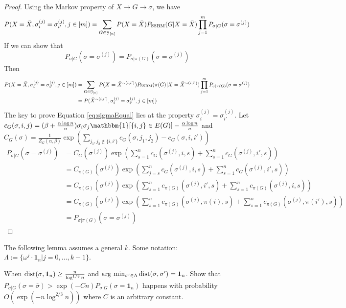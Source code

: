 \documentclass{article}
\begin{document}
\begin{proof}
Using the Markov property of $X \to G \to \sigma$, we have
\begin{align*}
P(X=\bar{X}, \sigma_i^{(j)} = \sigma_{i'}^{(j)}, j\in[m]) & = \sum_{G \in \mathcal{G}_{[n]}} P(X=\bar{X}) P_{\operatorname{SSBM}}(G  | X = \bar{X})\prod_{j=1}^m P_{\sigma | G}(\sigma =\sigma^{(j)})\\
\end{align*}
If we can show that 
\begin{equation}\label{eq:sigmaEqual}
P_{\sigma | G}(\sigma =\sigma^{(j)}) = P_{\sigma | \pi(G)}(\sigma =\sigma^{(j)})
\end{equation}
Then 
\begin{align*}
P(X=\bar{X}, \sigma_i^{(j)} = \sigma_{i'}^{(j)}, j\in[m]) & = \sum_{G \in \mathcal{G}_{[n]}} P(X=\bar{X}^{\sim(i,i')}) P_{\operatorname{SSBM}}(\pi(G)  | X = \bar{X}^{\sim(i,i')})\prod_{j=1}^m P_{\sigma | \pi(G)}(\sigma =\sigma^{(j)})\\
& = P(\bar{X}^{\sim(i,i')}, \sigma_i^{(j)} = \sigma_{i'}^{(j)}, j\in[m])
\end{align*}
The key to prove Equation \eqref{eq:sigmaEqual} lies at the property $\sigma^{(j)}_i = \sigma^{(j)}_{i'}$.
Let $c_G(\sigma, i,j) = (\beta + \frac{\alpha \log n}{n})\sigma_i \sigma_j \mathbbm{1}[\{i,j\}\in E(G)]  - \frac{\alpha \log n}{n}$
and $C_G(\sigma) = \frac{1}{Z_G(\alpha, \beta)}\exp(\sum_{j_1, j_2 \not\in \{i,i'\}} c_G(\sigma, j_1, j_2) - c_G(\sigma, i,i'))$
\begin{align*}
P_{\sigma | G}(\sigma =\sigma^{(j)}) & = C_G(\sigma^{(j)})\exp(\sum_{s=1}^n c_G(\sigma^{(j)}, i, s)
+ \sum_{s=1}^n c_G(\sigma^{(j)}, i',s) ) \\
& = C_{\pi(G)}(\sigma^{(j)})\exp(\sum_{j=s}^n c_G(\sigma^{(j)}, i, s)
+ \sum_{s=1}^n c_G(\sigma^{(j)}, i',s) ) \\
& = C_{\pi(G)}(\sigma^{(j)})\exp(\sum_{s=1}^n c_{\pi(G)}(\sigma^{(j)}, i', s)+ \sum_{s=1}^n c_{\pi(G)}(\sigma^{(j)}, i, s) ) \\
& = C_{\pi(G)}(\sigma^{(j)})\exp(\sum_{s=1}^n c_{\pi(G)}(\sigma^{(j)}, \pi(i), s) + \sum_{s=1}^n c_{\pi(G)}(\sigma^{(j)}, \pi(i'), s) ) \\
& = P_{\sigma | \pi(G)}(\sigma =\sigma^{(j)})
\end{align*}
\end{proof}
The following lemma assumes a general $k$.
Some notation: $\Lambda := \{ \omega^j  \cdot \mathbf{1}_n | j=0, \dots,k-1\}$.
\begin{lemma}
	When $\operatorname{dist}(\bar{\sigma}, \mathbf{1}_n) \geq \frac{n}{\log^{1/3} n}$ and $\arg\,\min_{\sigma'\in \Lambda} \operatorname{dist}(\bar{\sigma}, \sigma') = \mathbf{1}_n$. Show that
	$P_{\sigma | G}(\sigma = \bar{\sigma} ) > \exp(-Cn) P_{\sigma | G}(\sigma = \mathbf{1}_n)$
	happens with probability $O(\exp(-n \log^{2/3} n ))$ where $C$ is an arbitrary constant.
\end{lemma}
\end{document}
